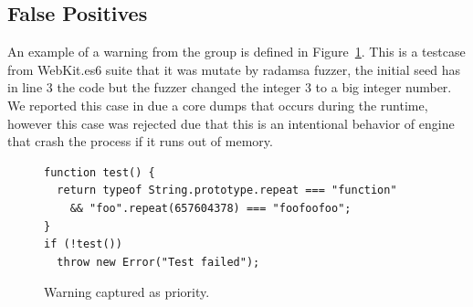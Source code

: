 \documentclass[10pt,conference,anonymous]{IEEEtran}
\begin{document}
\subsection{False Positives}

An example of a warning from the \hi{} group is defined in Figure~\ref{fig:hi-priority}. 
This is a testcase from WebKit.es6 suite that it was mutate by radamsa fuzzer, the 
initial seed has in line 3 the code  but the fuzzer changed the 
integer 3 to a big integer number. We reported this case in \chakra{} due a core dumps that occurs
during the runtime, however this case was rejected due  that
this is an intentional behavior of engine that crash the process if it runs out of memory.

\begin{figure}[h!]
  \centering
  \scriptsize
  \begin{lstlisting}
function test() {
  return typeof String.prototype.repeat === "function"
    && "foo".repeat(657604378) === "foofoofoo";
}
if (!test())
  throw new Error("Test failed");
  \end{lstlisting}
  \normalsize
  \caption{Warning captured as \hi{} priority.}
  \label{fig:hi-priority}
  \end{figure}
\end{document}
